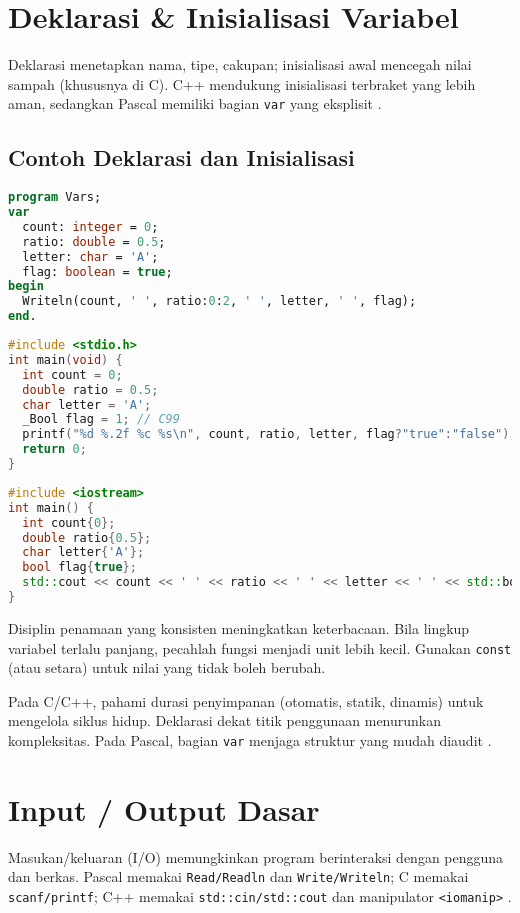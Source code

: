 \documentclass[../main.tex]{subfiles}
\begin{document}
\section{Deklarasi \& Inisialisasi Variabel}
Deklarasi menetapkan nama, tipe, cakupan; inisialisasi awal mencegah nilai sampah (khususnya di C). C++ mendukung inisialisasi terbraket yang lebih aman, sedangkan Pascal memiliki bagian \texttt{var} yang eksplisit \parencite{pascal-tutorial-wikibooks,gnu-c-manual,cpp-reference}.

\subsection{Contoh Deklarasi dan Inisialisasi}
\begin{lstlisting}[language=Pascal, caption={Deklarasi dan inisialisasi di Pascal}]
program Vars;
var
  count: integer = 0;
  ratio: double = 0.5;
  letter: char = 'A';
  flag: boolean = true;
begin
  Writeln(count, ' ', ratio:0:2, ' ', letter, ' ', flag);
end.
\end{lstlisting}

\begin{lstlisting}[language=C, caption={Deklarasi dan inisialisasi di C}]
#include <stdio.h>
int main(void) {
  int count = 0;
  double ratio = 0.5;
  char letter = 'A';
  _Bool flag = 1; // C99
  printf("%d %.2f %c %s\n", count, ratio, letter, flag?"true":"false");
  return 0;
}
\end{lstlisting}

\begin{lstlisting}[language=C++, caption={Deklarasi dan inisialisasi di C++}]
#include <iostream>
int main() {
  int count{0};
  double ratio{0.5};
  char letter{'A'};
  bool flag{true};
  std::cout << count << ' ' << ratio << ' ' << letter << ' ' << std::boolalpha << flag << '\n';
}
\end{lstlisting}

Disiplin penamaan yang konsisten meningkatkan keterbacaan. Bila lingkup variabel terlalu panjang, pecahlah fungsi menjadi unit lebih kecil. Gunakan \texttt{const} (atau setara) untuk nilai yang tidak boleh berubah.

Pada C/C++, pahami durasi penyimpanan (otomatis, statik, dinamis) untuk mengelola siklus hidup. Deklarasi dekat titik penggunaan menurunkan kompleksitas. Pada Pascal, bagian \texttt{var} menjaga struktur yang mudah diaudit \parencite{free-pascal-docs,gnu-c-manual}.

\section{Input / Output Dasar}
Masukan/keluaran (I/O) memungkinkan program berinteraksi dengan pengguna dan berkas. Pascal memakai \texttt{Read/Readln} dan \texttt{Write/Writeln}; C memakai \texttt{scanf/printf}; C++ memakai \texttt{std::cin/std::cout} dan manipulator \texttt{<iomanip>} \parencite{w3pascal-io,gnu-c-manual,cplusplus-io,cpp-iomanip}.
\end{document}
